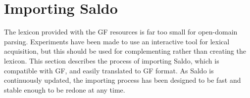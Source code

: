 \documentclass{report}
\begin{document}


\chapter{Importing Saldo}
\label{sec:prog.saldo}
The lexicon provided with the GF resources is far too small for open-domain parsing.
Experiments have been made to use an interactive tool for lexical acquisition,
but this should be used for complementing rather than creating the lexicon.
This section describes the process of importing Saldo, which is 
compatible with GF, and easily translated to GF format.
As Saldo is continuously updated, the importing process has been designed to be fast
and stable enough to be redone at any time.
\end{document}
